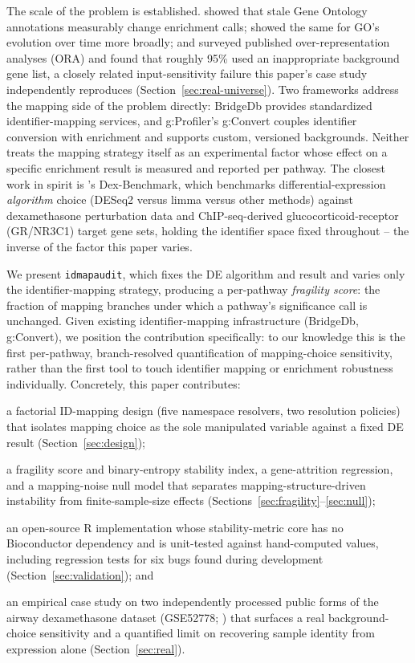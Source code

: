\documentclass[webpdf,contemporary,large]{oup-authoring-template}
\theoremstyle{thmstyleone}%
\theoremstyle{thmstyletwo}%
\theoremstyle{thmstylethree}%
\begin{document}
The scale of the problem is established. \citet{wadi2016outdated} showed that stale Gene Ontology annotations measurably change enrichment calls; \citet{tomczak2018gene} showed the same for GO's evolution over time more broadly; and \citet{wijesooriya2022orabackground} surveyed published over-representation analyses (ORA) and found that roughly 95\% used an inappropriate background gene list, a closely related input-sensitivity failure this paper's case study independently reproduces (Section~\ref{sec:real-universe}). Two frameworks address the mapping side of the problem directly: BridgeDb \citep{vaniersel2010bridgedb} provides standardized identifier-mapping services, and g:Profiler's g:Convert \citep{kolberg2023gprofiler} couples identifier conversion with enrichment and supports custom, versioned backgrounds. Neither treats the mapping strategy itself as an experimental factor whose effect on a specific enrichment result is measured and reported per pathway. The closest work in spirit is \citet{xie2023dexbenchmark}'s Dex-Benchmark, which benchmarks differential-expression \emph{algorithm} choice (DESeq2 versus limma versus other methods) against dexamethasone perturbation data and ChIP-seq-derived glucocorticoid-receptor (GR/NR3C1) target gene sets, holding the identifier space fixed throughout -- the inverse of the factor this paper varies.

We present \texttt{idmapaudit}, which fixes the DE algorithm and result and varies only the identifier-mapping strategy, producing a per-pathway \emph{fragility score}: the fraction of mapping branches under which a pathway's significance call is unchanged. Given existing identifier-mapping infrastructure (BridgeDb, g:Convert), we position the contribution specifically: to our knowledge this is the first per-pathway, branch-resolved quantification of mapping-choice sensitivity, rather than the first tool to touch identifier mapping or enrichment robustness individually. Concretely, this paper contributes:
\begin{unlist}
\item a factorial ID-mapping design (five namespace resolvers, two resolution policies) that isolates mapping choice as the sole manipulated variable against a fixed DE result (Section~\ref{sec:design});
\item a fragility score and binary-entropy stability index, a gene-attrition regression, and a mapping-noise null model that separates mapping-structure-driven instability from finite-sample-size effects (Sections~\ref{sec:fragility}--\ref{sec:null});
\item an open-source R implementation whose stability-metric core has no Bioconductor dependency and is unit-tested against hand-computed values, including regression tests for six bugs found during development (Section~\ref{sec:validation}); and
\item an empirical case study on two independently processed public forms of the airway dexamethasone dataset (GSE52778; \citealp{himes2014rnaseq}) that surfaces a real background-choice sensitivity and a quantified limit on recovering sample identity from expression alone (Section~\ref{sec:real}).
\end{unlist}
\end{document}
